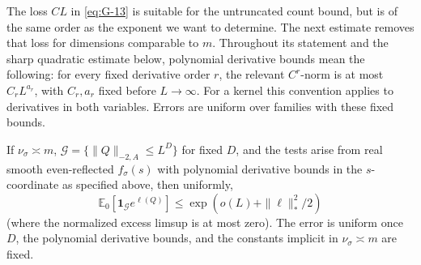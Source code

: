 The loss \(CL\) in \eqref{eq:G-13} is suitable for the untruncated count bound, but is of the same order as the exponent we want to determine. The next estimate removes that loss for dimensions comparable to \(m\). Throughout its statement and the sharp quadratic estimate below, polynomial derivative bounds mean the following: for every fixed derivative order \(r\), the relevant \(C^r\)-norm is at most \(C_rL^{a_r}\), with \(C_r,a_r\) fixed before \(L\to\infty\). For a kernel this convention applies to derivatives in both variables. Errors are uniform over families with these fixed bounds.

\begin{theorem}\label{thm:03-uniform-source}\label{E:sharp-reference-source}
If \(\nu_\sigma\asymp m\), \(\mathcal G=\{\|Q\|_{-2,A}\le L^D\}\) for fixed \(D\), and the tests arise from real smooth even-reflected \(f_\sigma(s)\) with polynomial derivative bounds in the \(s\)-coordinate as specified above, then uniformly,
\begin{equation}
 \mathbb E_0[\mathbf 1_{\mathcal G} e^{\ell(Q)}]
 \le \exp(o(L)+\|\ell\|_*^2/2)
 \label{eq:G-14}
\end{equation}
(where the normalized excess limsup is at most zero). The error is uniform once \(D\), the polynomial derivative bounds, and the constants implicit in \(\nu_\sigma\asymp m\) are fixed.
\end{theorem}
